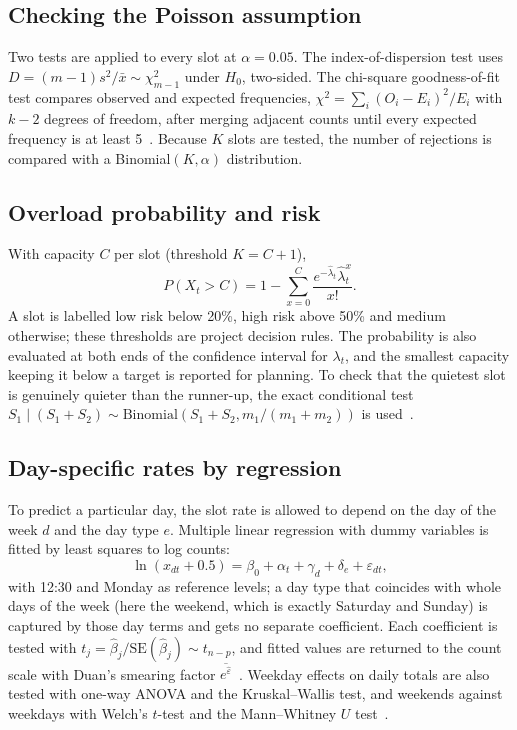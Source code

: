 \documentclass[conference,a4paper]{IEEEtran}
\begin{document}
\subsection{Checking the Poisson assumption}
Two tests are applied to every slot at $\alpha = 0.05$. The index-of-dispersion test uses
$D = (m-1)s^2/\bar x \sim \chi^2_{m-1}$ under $H_0$, two-sided. The chi-square goodness-of-fit test compares observed
and expected frequencies, $\chi^2 = \sum_i (O_i - E_i)^2/E_i$ with $k-2$ degrees of freedom, after merging adjacent
counts until every expected frequency is at least 5~\cite{cochran1954}. Because $K$ slots are tested, the number of
rejections is compared with a Binomial$(K, \alpha)$ distribution.

\subsection{Overload probability and risk}
With capacity $C$ per slot (threshold $K = C+1$),
\begin{equation}
P(X_t > C) = 1 - \sum_{x=0}^{C}\frac{e^{-\hat\lambda_t}\hat\lambda_t^{x}}{x!}.
\end{equation}
A slot is labelled low risk below 20\%, high risk above 50\% and medium otherwise; these thresholds are project
decision rules. The probability is also evaluated at both ends of the confidence interval for $\lambda_t$, and the
smallest capacity keeping it below a target is reported for planning. To check that the quietest slot is genuinely
quieter than the runner-up, the exact conditional test
$S_1 \mid (S_1 + S_2) \sim \mathrm{Binomial}(S_1+S_2, m_1/(m_1+m_2))$ is used~\cite{przyborowski1940}.

\subsection{Day-specific rates by regression}
To predict a particular day, the slot rate is allowed to depend on the day of the week $d$ and the day type $e$. Multiple
linear regression with dummy variables is fitted by least squares to log counts:
\begin{equation}
\ln(x_{dt} + 0.5) = \beta_0 + \alpha_t + \gamma_d + \delta_e + \varepsilon_{dt},
\end{equation}
with 12:30 and Monday as reference levels; a day type that coincides with whole days of the week (here the weekend,
which is exactly Saturday and Sunday) is captured by those day terms and gets no separate coefficient. Each
coefficient is tested with
$t_j = \hat\beta_j/\mathrm{SE}(\hat\beta_j) \sim t_{n-p}$, and fitted values are returned to the count scale with
Duan's smearing factor $\overline{e^{\hat\varepsilon}}$~\cite{duan1983}. Weekday effects on daily totals are also
tested with one-way ANOVA and the Kruskal--Wallis test, and weekends against weekdays with Welch's $t$-test and the
Mann--Whitney $U$ test~\cite{johnson2018}.
\end{document}
